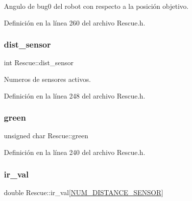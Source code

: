 Angulo de bug0 del robot con respecto a la posición objetivo. 



Definición en la línea 260 del archivo Rescue.\+h.

\mbox{\label{classRescue_ab1e1f44c42138628cf62b8d56430e776_ab1e1f44c42138628cf62b8d56430e776}} 
\subsubsection{\texorpdfstring{dist\+\_\+sensor}{dist\_sensor}}
{\footnotesize\ttfamily int Rescue\+::dist\+\_\+sensor\hspace{0.3cm}{\ttfamily [private]}}



Numeros de sensores activos. 



Definición en la línea 248 del archivo Rescue.\+h.

\mbox{\label{classRescue_a5ec72c1115b4a89bd6079f74866b4717_a5ec72c1115b4a89bd6079f74866b4717}} 
\subsubsection{\texorpdfstring{green}{green}}
{\footnotesize\ttfamily unsigned char Rescue\+::green\hspace{0.3cm}{\ttfamily [private]}}



Definición en la línea 240 del archivo Rescue.\+h.

\mbox{\label{classRescue_aaafc15a9b059bf1acbfa360915308fe5_aaafc15a9b059bf1acbfa360915308fe5}} 
\subsubsection{\texorpdfstring{ir\+\_\+val}{ir\_val}}
{\footnotesize\ttfamily double Rescue\+::ir\+\_\+val\mbox{[}\hyperlink{Rescue_8h_a3bfa6c68d124846bd629eef1504b2556_a3bfa6c68d124846bd629eef1504b2556}{N\+U\+M\+\_\+\+D\+I\+S\+T\+A\+N\+C\+E\+\_\+\+S\+E\+N\+S\+OR}\mbox{]}\hspace{0.3cm}{\ttfamily [private]}}



